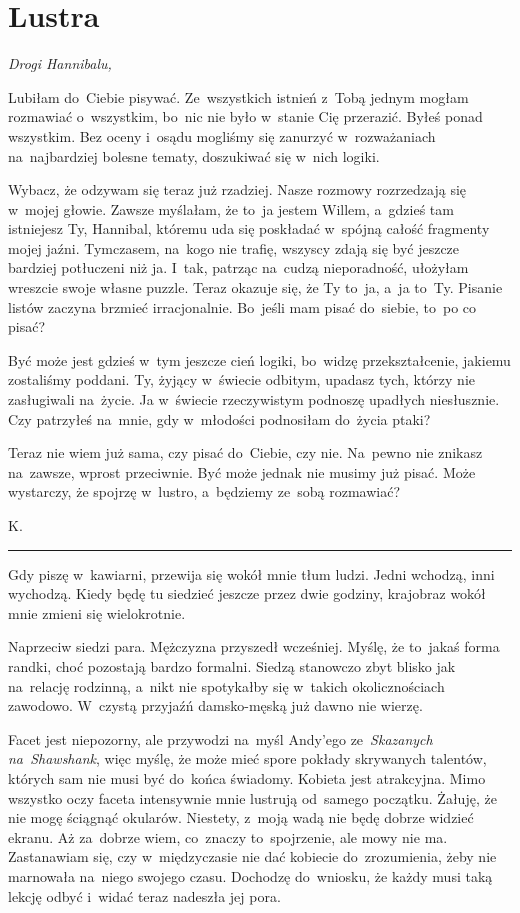 \documentclass[9pt, a5paper]{memoir}
\begin{document}
\section{Lustra}
{
\itshape
Drogi Hannibalu,

Lubiłam do~Ciebie pisywać. Ze~wszystkich istnień z~Tobą jednym mogłam rozmawiać o~wszystkim, bo~nic nie było w~stanie Cię przerazić. Byłeś ponad wszystkim. Bez oceny i~osądu mogliśmy się zanurzyć w~rozważaniach na~najbardziej bolesne tematy, doszukiwać się w~nich logiki.

Wybacz, że odzywam się teraz już rzadziej. Nasze rozmowy rozrzedzają się w~mojej głowie. Zawsze myślałam, że to~ja jestem Willem, a~gdzieś tam istniejesz Ty, Hannibal, któremu uda się poskładać w~spójną całość fragmenty mojej jaźni. Tymczasem, na~kogo nie trafię, wszyscy zdają się być jeszcze bardziej potłuczeni niż ja. I~tak, patrząc na~cudzą nieporadność, ułożyłam wreszcie swoje własne puzzle. Teraz okazuje się, że Ty to~ja, a~ja to~Ty. Pisanie listów zaczyna brzmieć irracjonalnie. Bo~jeśli mam pisać do~siebie, to~po co pisać?

Być może jest gdzieś w~tym jeszcze cień logiki, bo~widzę przekształcenie, jakiemu zostaliśmy poddani. Ty, żyjący w~świecie odbitym, upadasz tych, którzy nie zasługiwali na~życie. Ja w~świecie rzeczywistym podnoszę upadłych niesłusznie. Czy patrzyłeś na~mnie, gdy w~młodości podnosiłam do~życia ptaki?

Teraz nie wiem już sama, czy pisać do~Ciebie, czy nie. Na~pewno nie znikasz na~zawsze, wprost przeciwnie. Być może jednak nie musimy już pisać. Może wystarczy, że spojrzę w~lustro, a~będziemy ze~sobą rozmawiać?

K.
}

\fancybreak{* \quad * \quad *}

Gdy piszę w~kawiarni, przewija się wokół mnie tłum ludzi. Jedni wchodzą, inni wychodzą. Kiedy będę tu siedzieć jeszcze przez dwie godziny, krajobraz wokół mnie zmieni się wielokrotnie.

Naprzeciw siedzi para. Mężczyzna przyszedł wcześniej. Myślę, że to~jakaś forma randki, choć pozostają bardzo formalni. Siedzą stanowczo zbyt blisko jak na~relację rodzinną, a~nikt nie spotykałby się w~takich okolicznościach zawodowo. W~czystą przyjaźń damsko-męską już dawno nie wierzę.

Facet jest niepozorny, ale przywodzi na~myśl Andy'ego ze~\textit{Skazanych na~Shawshank}, więc myślę, że może mieć spore pokłady skrywanych talentów, których sam nie musi być do~końca świadomy. Kobieta jest atrakcyjna. Mimo wszystko oczy faceta intensywnie mnie lustrują od~samego początku. Żałuję, że nie mogę ściągnąć okularów. Niestety, z~moją wadą nie będę dobrze widzieć ekranu. Aż za~dobrze wiem, co~znaczy to~spojrzenie, ale mowy nie ma. Zastanawiam się, czy w~międzyczasie nie dać kobiecie do~zrozumienia, żeby nie marnowała na~niego swojego czasu. Dochodzę do~wniosku, że każdy musi taką lekcję odbyć i~widać teraz nadeszła jej pora.
\end{document}
